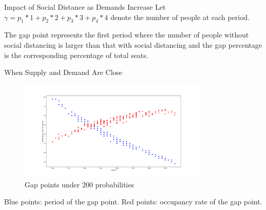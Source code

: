     \begin{frame}{Impact of Social Distance as Demands Increase}
        \small
        Let $\gamma = p_1 * 1 + p_2 * 2 + p_3 * 3 + p_4 * 4$ denote the number of people at each period.
        \begin{figure}[h]
            \centering
          \end{figure}

        The gap point represents the first period where the number of people without social distancing is larger than that with social distancing and the gap percentage is the corresponding percentage of total seats.
    \end{frame}
      
    \begin{frame}{When Supply and Demand Are Close}
      \begin{figure}[ht]
        \centering
        \includegraphics[width = 0.8\textwidth]{./images/scatter.pdf}
        \caption{Gap points under 200 probabilities}
    \end{figure}
    \scriptsize
    Blue points: period of the gap point.
    Red points: occupancy rate of the gap point. 
    \end{frame}